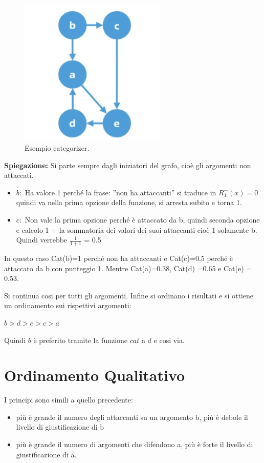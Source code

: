     \begin{figure}[htp]
        \centering
        \includegraphics[width=7cm, keepaspectratio]{img/Cap8/quantitativo2.png}
        \caption{Esempio categorizer.}
    \end{figure}
    \noindent \textbf{Spiegazione: } Si parte sempre dagli iniziatori del grafo,
    cioè gli argomenti non attaccati.
    \begin{itemize}
        \item $b:$ Ha valore 1 perché la frase: ”non ha attaccanti” si traduce
              in $R^-_1(x) = 0$ quindi va nella prima opzione della funzione, si
              arresta subito e torna 1.
        \item $c:$ Non vale la prima opzione perché è attaccato da b, quindi
              seconda opzione e calcolo 1 + la sommatoria dei valori dei suoi
              attaccanti cioè 1 solamente b. Quindi verrebbe $\frac{1}{1+1}$ = 0.5
    \end{itemize}
    In questo caso Cat(b)=1 perché non ha attaccanti e Cat(c)=0.5 perché è
    attaccato da b con punteggio 1. Mentre Cat(a)=0.38, Cat(d) =0.65 e Cat(e) =
    0.53.

    \vspace{0.3cm}

    Si continua cosi per tutti gli argomenti. Infine si ordinano i risultati e
    si ottiene un ordinamento sui rispettivi argomenti:
    \begin{center}
        $b>d>e>c>a$
    \end{center}
    Quindi $b$ è preferito tramite la funzione $cat$ a $d$ e cosi via.
    \section{Ordinamento Qualitativo}
    I principi sono simili a quello precedente:
    \begin{itemize}
        \item più è grande il numero degli attaccanti su un argomento b, più è
              debole il livello di giustificazione di b
        \item più è grande il numero di argomenti che difendono a, più è forte
              il livello di giustificazione di a.
    \end{itemize}
